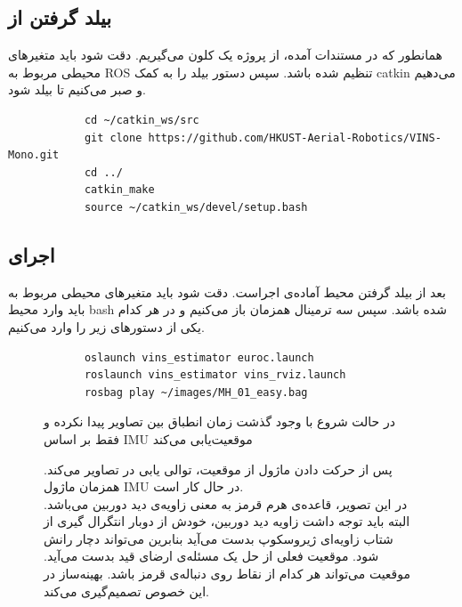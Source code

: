 \documentclass[11pt, a4paper]{article}
\begin{document}
	
	\subsection{بیلد گرفتن از
		}
	همانطور که در مستندات آمده، از پروژه یک کلون می‌گیریم. دقت شود باید متغیرهای محیطی مربوط به \gls{ROS} تنظیم شده باشد. سپس دستور بیلد را به کمک catkin می‌دهیم و صبر می‌کنیم تا بیلد شود.
	\begin{LTR}
		\begin{verbatim}
			cd ~/catkin_ws/src
			git clone https://github.com/HKUST-Aerial-Robotics/VINS-Mono.git
			cd ../
			catkin_make
			source ~/catkin_ws/devel/setup.bash
		\end{verbatim}
	\end{LTR}
	\subsection{اجرای
		}
	بعد از بیلد گرفتن محیط آماده‌ی اجراست.  دقت شود باید متغیرهای محیطی مربوط به 
	 باید وارد محیط bash شده باشد.
	سپس سه ترمینال همزمان باز می‌کنیم و در هر کدام یکی از دستورهای زیر را وارد می‌کنیم.
	\begin{LTR}
		\begin{verbatim}
			oslaunch vins_estimator euroc.launch 
			roslaunch vins_estimator vins_rviz.launch
			rosbag play ~/images/MH_01_easy.bag 
		\end{verbatim}
	\end{LTR}
	
	\begin{figure}[H]
		\centering
		\caption[مقداردهی اولیه در محیط Mono]{
			در حالت شروع با وجود گذشت زمان انطباق بین تصاویر پیدا نکرده و فقط بر اساس 
			\gls{IMU}  موقعیت‌یابی می‌کند}
		\label{fig:mono1}
	\end{figure}
	
	
	\begin{figure}[H]
		\centering
		\caption[حرکت و جهت در محیط مونو]{پس از حرکت دادن ماژول از موقعیت، 
			 توالی یابی در تصاویر می‌کند. همزمان ماژول \gls{IMU} در حال کار است.
			\\ در این تصویر، قاعده‌ی هرم قرمز به معنی زاویه‌ی دید دوربین می‌باشد. 
			البته باید توجه داشت زاویه دید دوربین، خودش از  دوبار انتگرال گیری از شتاب زاویه‌ای ژیروسکوپ بدست می‌آید بنابرین می‌تواند دچار رانش شود. موقعیت فعلی از حل یک مسئله‌ی ارضای قید بدست می‌آید. موقعیت می‌تواند هر کدام از نقاط روی دنباله‌ی قرمز باشد. بهینه‌ساز در این خصوص تصمیم‌گیری می‌کند.}
		\label{fig:mono2}
	\end{figure}	
	
\end{document}
